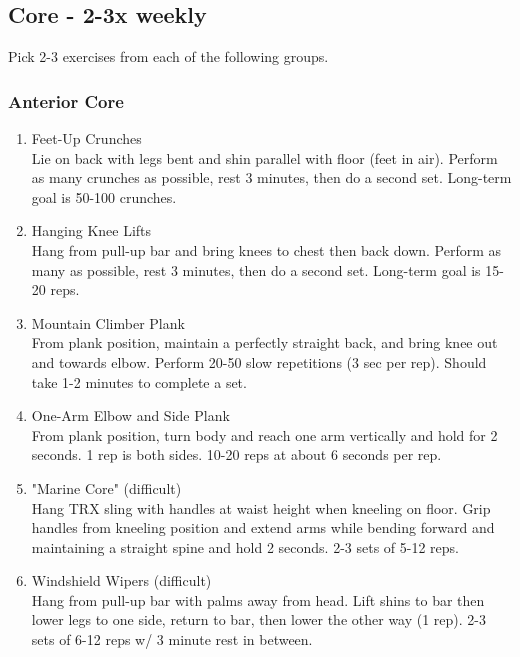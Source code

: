 \documentclass[12pt, letterpaper]{article}
\begin{document}
\subsection{Core - 2-3x weekly}

Pick 2-3 exercises from each of the following groups.

\subsubsection{Anterior Core}

\begin{enumerate}
    \item Feet-Up Crunches \\ 
          Lie on back with legs bent and shin parallel with floor (feet in air). Perform as many crunches as possible, 
          rest 3 minutes, then do a second set. Long-term goal is 50-100 crunches.
    \item Hanging Knee Lifts \\ 
          Hang from pull-up bar and bring knees to chest then back down. Perform as many as possible, rest 3 minutes, 
          then do a second set. Long-term goal is 15-20 reps.
    \item Mountain Climber Plank \\ 
          From plank position, maintain a perfectly straight back, and bring knee out and towards elbow. 
          Perform 20-50 slow repetitions (3 sec per rep). 
          Should take 1-2 minutes to complete a set.
    \item One-Arm Elbow and Side Plank \\ 
          From plank position, turn body and reach one arm vertically and hold for 2 seconds. 1 rep is both sides. 
          10-20 reps at about 6 seconds per rep. 
    \item "Marine Core" (difficult) \\ 
          Hang TRX sling with handles at waist height when kneeling on floor. Grip handles from kneeling position 
          and extend arms while bending forward and maintaining a straight spine and hold 2 seconds. 2-3 sets of 5-12 reps.
    \item Windshield Wipers (difficult) \\ 
          Hang from pull-up bar with palms away from head. Lift shins to bar then lower legs to one side, return to bar, 
          then lower the other way (1 rep). 2-3 sets of 6-12 reps w/ 3 minute rest in between.    
\end{enumerate}
\end{document}

